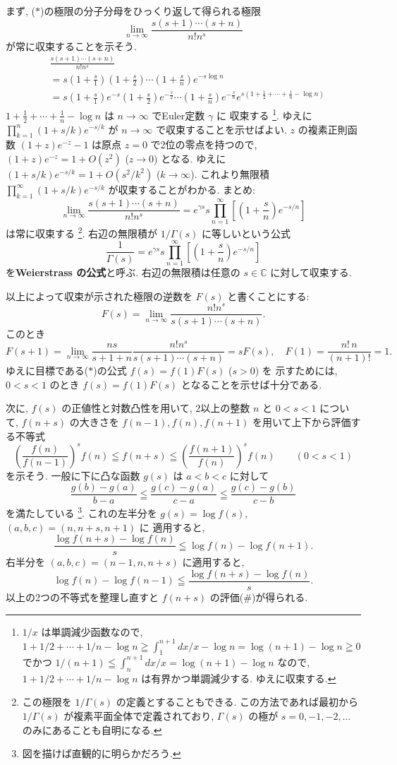 \documentclass[12pt,twoside]{jarticle}
\newcommand\C{{\mathbb C}} %
\theoremstyle{jplain}
\theoremstyle{jplain}
\theoremstyle{jplain}
\numberwithin{theorem}{section}
\numberwithin{equation}{section}
\numberwithin{figure}{section}
\numberwithin{table}{section}
\begin{document}
まず, ($*$)の極限の分子分母をひっくり返して得られる極限
\[
\lim_{n\to\infty}\frac{s(s+1)\cdots(s+n)}{n!n^s}
\]
が常に収束することを示そう.
\begin{align*}
&
\frac{s(s+1)\cdots(s+n)}{n!n^s}
\\ &
=
s\left(1+\frac{s}{1}\right)\left(1+\frac{s}{2}\right)\cdots\left(1+\frac{s}{n}\right)
e^{-s\log n}
\\ &
=
s\left(1+\frac{s}{1}\right)e^{-s}\left(1+\frac{s}{2}\right)e^{-\frac{s}{2}}
 \cdots\left(1+\frac{s}{n}\right)e^{-\frac{s}{n}}
e^{s\left(1+\frac{1}{2}+\cdots+\frac{1}{n}-\log n\right)}
\end{align*}
$1+\frac{1}{2}+\cdots+\frac{1}{n}-\log n$ は $n\to\infty$ でEuler定数 $\gamma$ に
収束する%
\footnote{$1/x$ は単調減少函数なので, 
$1+1/2+\cdots+1/n-\log n\geqq\int_1^{n+1}dx/x-\log n=\log(n+1)-\log n\geqq 0$
でかつ $1/(n+1)\leqq\int_n^{n+1}dx/x=\log(n+1)-\log n$ なので,
$1+1/2+\cdots+1/n-\log n$ は有界かつ単調減少する. ゆえに収束する.}.
ゆえに $\prod_{k=1}^n(1+s/k)e^{-s/k}$ が $n\to\infty$ で収束することを示せばよい. 
$z$ の複素正則函数 $(1+z)e^{-z}-1$ は原点 $z=0$ で2位の零点を持つので, 
$(1+z)e^{-z}=1+O(z^2)$ ($z\to 0$) となる.
ゆえに $(1+s/k)e^{-s/k}=1+O(s^2/k^2)$ ($k\to\infty$).
これより無限積 $\prod_{k=1}^\infty(1+s/k)e^{-s/k}$ が収束することがわかる.
まとめ:
\[
\lim_{n\to\infty}\frac{s(s+1)\cdots(s+n)}{n!n^s}
=e^{\gamma s}s\prod_{n=1}^\infty\left[ \left(1+\frac{s}{n}\right)e^{-s/n} \right]
\]
は常に収束する%
\footnote{この極限を $1/\Gamma(s)$ の定義とすることもできる.
この方法であれば最初から $1/\Gamma(s)$ が複素平面全体で定義されており, 
$\Gamma(s)$ の極が $s=0,-1,-2,\ldots$ のみにあることも自明になる.}.
右辺の無限積が $1/\Gamma(s)$ に等しいという公式
\[
\frac{1}{\Gamma(s)}
=e^{\gamma s}s\prod_{n=1}^\infty\left[ \left(1+\frac{s}{n}\right)e^{-s/n} \right]
\]
を{\bf Weierstrass の公式}と呼ぶ. 
右辺の無限積は任意の $s\in\C$ に対して収束する.

以上によって収束が示された極限の逆数を $F(s)$ と書くことにする:
\[
F(s)=\lim_{n\to\infty}\frac{n!n^s}{s(s+1)\cdots(s+n)}.
\]
このとき
\[
F(s+1)
=\lim_{n\to\infty}
\frac{ns}{s+1+n}\frac{n!n^s}{s(s+1)\cdots(s+n)}
=sF(s), \quad
F(1)=\frac{n!\,n}{(n+1)!}=1.
\]
ゆえに目標である($*$)の公式 $f(s)=f(1)F(s)$ ($s>0$) を
示すためには, $0<s<1$ のとき $f(s)=f(1)F(s)$ となることを示せば十分である.

次に, $f(s)$ の正値性と対数凸性を用いて, 
2以上の整数 $n$ と $0<s<1$ について, 
$f(n+s)$ の大きさを $f(n-1),f(n),f(n+1)$ を用いて上下から評価する不等式
\[
\left(\frac{f(n)}{f(n-1)}\right)^s f(n)
\leqq f(n+s)
\leqq \left(\frac{f(n+1)}{f(n)}\right)^s f(n)
\qquad(0<s<1)
\tag{$\#$}
\]
を示そう. 一般に下に凸な函数 $g(s)$ は $a<b<c$ に対して
\[
\frac{g(b)-g(a)}{b-a} 
\leqq \frac{g(c)-g(a)}{c-a} 
\leqq \frac{g(c)-g(b)}{c-b}
\]
を満たしている
\footnote{図を描けば直観的に明らかだろう.}.
これの左半分を $g(s)=\log f(s)$, $(a,b,c)=(n,n+s,n+1)$ に
適用すると,
\[
\frac{\log f(n+s)-\log f(n)}{s}\leqq \log f(n)-\log f(n+1).
\]
右半分を $(a,b,c)=(n-1,n,n+s)$ に適用すると, 
\[
\log f(n)-\log f(n-1)\leqq\frac{\log f(n+s)-\log f(n)}{s}.
\]
以上の2つの不等式を整理し直すと $f(n+s)$ の評価($\#$)が得られる.
\end{document}
